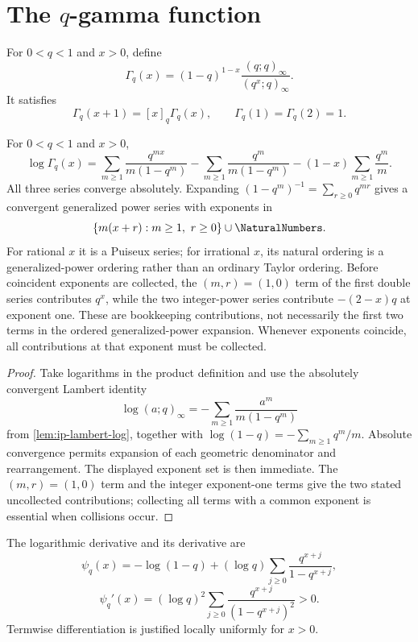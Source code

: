 \section{\texorpdfstring{The \(q\)-gamma function}{The q-gamma function}}
\label{sec:qs-qgamma}

For \(0<q<1\) and \(x>0\), define
\[
  \Gamma_q(x)
  =(1-q)^{1-x}\frac{(q;q)_\infty}{(q^x;q)_\infty}.
\]
It satisfies
\[
  \Gamma_q(x+1)=[x]_q\Gamma_q(x),
  \qquad
  \Gamma_q(1)=\Gamma_q(2)=1.
\]

\begin{proposition}[Exact generalized expansion at \(q=0\)]
\label{prop:qs-qgamma-zero}
For \(0<q<1\) and \(x>0\),
\[
  \log\Gamma_q(x)
  =\sum_{m\ge1}\frac{q^{mx}}{m(1-q^m)}
   -\sum_{m\ge1}\frac{q^m}{m(1-q^m)}
   -(1-x)\sum_{m\ge1}\frac{q^m}{m}.
\]
All three series converge absolutely.  Expanding
\((1-q^m)^{-1}=\sum_{r\ge0}q^{mr}\) gives a convergent generalized power
series with exponents in
\[
  \{m(x+r):m\ge1,\ r\ge0\}\cup\NaturalNumbers.
\]
For rational \(x\) it is a Puiseux series; for irrational \(x\), its natural
ordering is a generalized-power ordering rather than an ordinary Taylor
ordering.  Before coincident exponents are collected, the \((m,r)=(1,0)\)
term of the first double series contributes \(q^x\), while the two
integer-power series contribute \(-(2-x)q\) at exponent one.  These are
bookkeeping contributions, not necessarily the first two terms in the
ordered generalized-power expansion.  Whenever exponents coincide, all
contributions at that exponent must be collected.
\end{proposition}

\begin{proof}
Take logarithms in the product definition and use the absolutely convergent
Lambert identity
\[
  \log(a;q)_\infty
  =-\sum_{m\ge1}\frac{a^m}{m(1-q^m)}
\]
from \cref{lem:ip-lambert-log}, together with
\(\log(1-q)=-\sum_{m\ge1}q^m/m\).  Absolute convergence permits expansion of
each geometric denominator and rearrangement.  The displayed exponent set is
then immediate.  The \((m,r)=(1,0)\) term and the integer exponent-one terms
give the two stated uncollected contributions; collecting all terms with a
common exponent is essential when collisions occur.
\end{proof}

The logarithmic derivative and its derivative are
\[
  \psi_q(x)
  =-\log(1-q)+(\log q)
    \sum_{j\ge0}\frac{q^{x+j}}{1-q^{x+j}},
\]
\[
  \psi_q'(x)
  =(\log q)^2
    \sum_{j\ge0}\frac{q^{x+j}}{(1-q^{x+j})^2}>0.
\]
Termwise differentiation is justified locally uniformly for \(x>0\).

